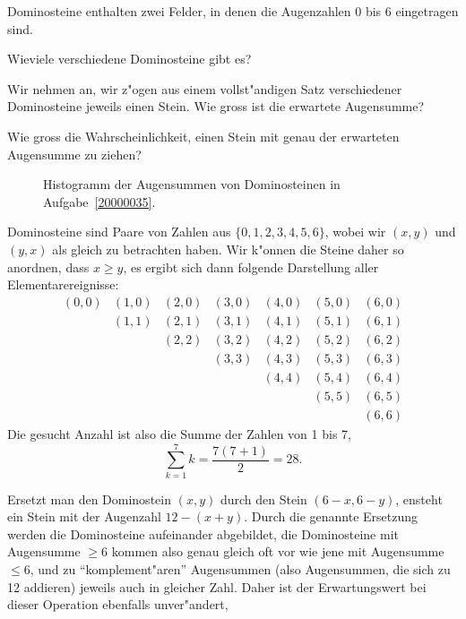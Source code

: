 Dominosteine enthalten zwei Felder, in denen die Augenzahlen
0 bis 6 eingetragen sind.
\begin{teilaufgaben}
\item Wieviele verschiedene Dominosteine gibt es?
\item Wir nehmen an, wir z"ogen aus einem vollst"andigen Satz verschiedener
Dominosteine jeweils einen Stein.
Wie gross ist die erwartete Augensumme?
\item
Wie gross die Wahrscheinlichkeit, einen Stein mit genau der
erwarteten Augensumme zu ziehen?
\end{teilaufgaben}

\begin{loesung}
\begin{figure}
\centering
{}
\caption{Histogramm der Augensummen von Dominosteinen in Aufgabe~\ref{20000035}.
\label{20000035:histogram}}
\end{figure}
\begin{teilaufgaben}
\item Dominosteine sind Paare von Zahlen aus $\{0,1,2,3,4,5,6\}$, wobei
wir $(x,y)$ und $(y,x)$ als gleich zu betrachten haben. Wir k"onnen die
Steine daher so anordnen, dass $x\ge y$, es ergibt sich dann folgende
Darstellung aller Elementarereignisse:
\[
\begin{matrix}
(0,0)&(1,0)&(2,0)&(3,0)&(4,0)&(5,0)&(6,0)\\
     &(1,1)&(2,1)&(3,1)&(4,1)&(5,1)&(6,1)\\
     &     &(2,2)&(3,2)&(4,2)&(5,2)&(6,2)\\
     &     &     &(3,3)&(4,3)&(5,3)&(6,3)\\
     &     &     &     &(4,4)&(5,4)&(6,4)\\
     &     &     &     &     &(5,5)&(6,5)\\
     &     &     &     &     &     &(6,6)
\end{matrix}
\]
Die gesucht Anzahl ist also die Summe der Zahlen von 1 bis 7,
\[
\sum_{k=1}^7k=\frac{7(7+1)}2=28.
\]
\item Ersetzt man den Dominostein $(x,y)$ durch den Stein $(6-x,6-y)$,
ensteht ein Stein mit der Augenzahl $12-(x+y)$. Durch die genannte
Ersetzung werden die Dominosteine aufeinander abgebildet, die Dominosteine
mit Augensumme $\ge6$ kommen also genau gleich oft vor wie jene mit
Augensumme $\le6$, und zu ``komplement"aren'' Augensummen (also Augensummen,
die sich zu 12 addieren) jeweils auch in gleicher Zahl. Daher ist
der Erwartungswert bei dieser Operation ebenfalls unver"andert,

\end{teilaufgaben}
\end{loesung}
